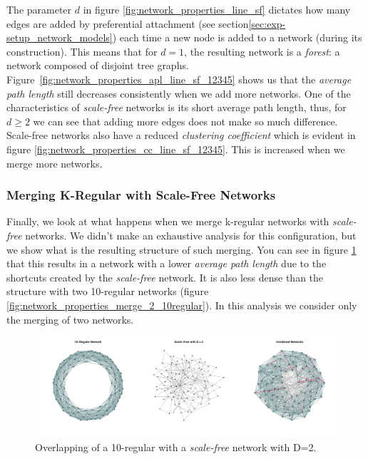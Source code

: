 \documentclass[preprint,number]{elsarticle}
\begin{document}
The parameter $d$ in figure \ref{fig:network_properties_line_sf} dictates how many edges are added by preferential attachment (see section\ref{sec:exp-setup_network_models}) each time a new node is added to a network (during its construction). This means that for $d=1$, the resulting network is a \textit{forest}: a network composed of disjoint tree graphs. Figure~\ref{fig:network_properties_apl_line_sf_12345} shows us that the \textit{average path length} still decreases consistently when we add more networks. One of the characteristics of \textit{scale-free} networks is its short average  path length, thus, for $d \ge 2$ we can see that adding more edges does not make so much difference. Scale-free networks also have a reduced \textit{clustering coefficient} which is evident in figure \ref{fig:network_properties_cc_line_sf_12345}. This is increased when we merge more networks.


\subsubsection{Merging K-Regular with Scale-Free Networks}
\noindent Finally, we look at what happens when we merge k-regular networks with \textit{scale-free} networks. We didn't make an exhaustive analysis for this configuration, but we show what is the resulting structure of such merging. You can see in figure \ref{fig:network_properties_merge_regular_scale-free} that this results in a network with a lower \textit{average path length} due to the shortcuts created by the \textit{scale-free} network. It is also less dense than the structure with two 10-regular networks (figure \ref{fig:network_properties_merge_2_10regular}). In this analysis we consider only the merging of two networks.

\begin{figure}[H]
	\centering
	\includegraphics[width=1\linewidth]{"../analysis/pdf/network_properties_10regular_2scale-free"}
	\begin{minipage}{0.9\textwidth}
		\caption{Overlapping of a 10-regular with a \textit{scale-free} network with D=2.}
		\label{fig:network_properties_merge_regular_scale-free}
	\end{minipage}
\end{figure}
\end{document}
